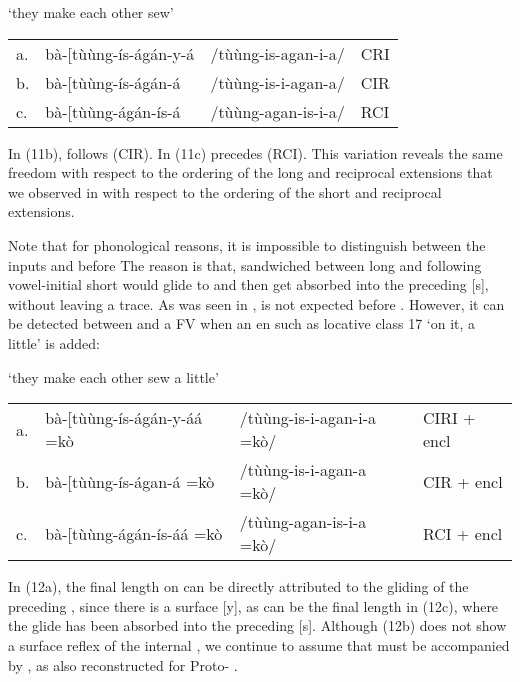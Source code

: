 \documentclass[output=paper,
modfonts
]{LSP/langsci}
\begin{document}
\ea `they make each other sew' \\
\begin{tabular}{@{}llll@{}}
a. & bà-{[}tùùng-ís-ágán-y-á & /tùùng-is-agan-i-a/ & CRI\\
b. & bà-{[}tùùng-ís-ágán-á & /tùùng-is-i-agan-a/ & CIR\\
c. & bà-{[}tùùng-ágán-ís-á & /tùùng-agan-is-i-a/ & RCI\\
\end{tabular}
\z

\noindent In (11b),  follows  (CIR). In (11c)
 precedes  (RCI). This variation reveals the
same freedom with respect to the ordering of the long  and
reciprocal extensions that we observed in  with respect to the
ordering of the short  and reciprocal extensions.

Note that for phonological reasons, it is impossible to distinguish
between the inputs  and  before 
The reason is that, sandwiched between long   and
following vowel-initial  short   would
glide to  and then get absorbed into the preceding {[}s{]},
without leaving a trace. As was seen in , 
is not expected before . However, it can be detected
between  and a FV when an en such as locative class 17
 `on it, a little' is added:

\ea `they make each other sew a little'\\
\begin{tabular}[t]{@{}llll@{}}
a. & bà-{[}tùùng-ís-ágán-y-áá =kò & /tùùng-is-i-agan-i-a =kò/ & CIRI + encl\\
b. & bà-{[}tùùng-ís-ágan-á =kò & /tùùng-is-i-agan-a =kò/ & CIR + encl\\
c. & bà-{[}tùùng-ágán-ís-áá =kò & /tùùng-agan-is-i-a =kò/ & RCI + encl\\
\end{tabular}
\z

\noindent In (12a), the final length on  can be directly attributed to
the gliding of the preceding , since there is a surface {[}y{]}, as
can be the final length in (12c), where the glide has been absorbed into
the preceding {[}s{]}. Although (12b) does not show a surface reflex of
the internal , we continue to assume that  must be
accompanied by , as also reconstructed for Proto- \citep{bastin1986}.
\end{document}
